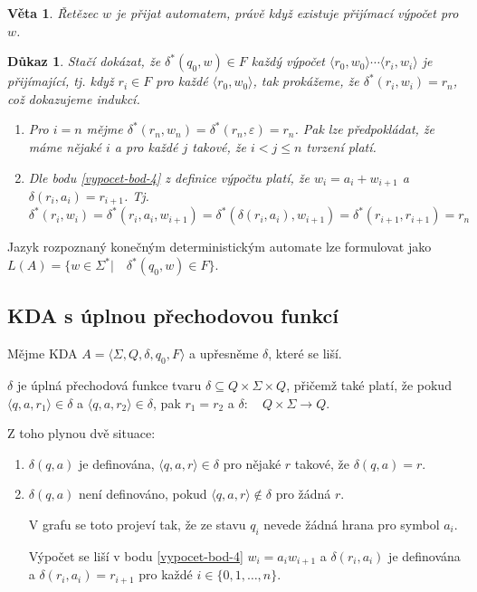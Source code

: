 \documentclass[10pt, a4paper, titlepage]{article}
\theoremstyle{note}
\newtheorem{dukaz}{Důkaz}
\newtheorem{veta}{Věta}
\begin{document}
\begin{veta}
Řetězec $w$ je přijat automatem, právě když existuje přijímací výpočet pro $w$.
\end{veta}

\begin{dukaz}
Stačí dokázat, že $\delta^*(q_0,w) \in F$ každý výpočet $\langle r_0, w_0 \rangle \cdots \langle r_i, w_i \rangle$ je přijímající,
tj. když $r_i \in F$ pro každé $\langle r_0, w_0 \rangle$, tak prokážeme, že $\delta^*(r_i, w_i) = r_n$, což dokazujeme indukcí.
\begin{enumerate}
\item
Pro $i = n$ mějme $\delta^*(r_n,w_n) = \delta^*(r_n, \varepsilon) = r_n$. Pak lze předpokládat, že máme nějaké $i$ a pro každé $j$ takové,
že $i < j \leq n$ tvrzení platí.

\item
Dle bodu \ref{vypocet-bod-4} z definice výpočtu platí, že $w_i = a_i + w_{i+1}$ a $\delta(r_i, a_i) = r_{i+1}$.
Tj.  $\delta^*(r_i,w_i) = \delta^*(r_i,a_i,w_{i+1}) = \delta^*(\delta(r_i, a_i), w_{i+1}) = \delta^*(r_{i+1}, r_{i+1}) = r_n$
\end{enumerate}
\end{dukaz}

Jazyk rozpoznaný konečným deterministickým automate lze formulovat jako
$L(A) = \lbrace w \in \Sigma^* |\quad \delta^*(q_0,w) \in F \rbrace$.

\subsection{KDA s úplnou přechodovou funkcí}

Mějme KDA $A = \langle \Sigma, Q, \delta, q_0, F \rangle$ a upřesněme $\delta$, které se liší.

$\delta$ je úplná přechodová funkce tvaru $\delta \subseteq Q \times \Sigma \times Q$, přičemž také platí, že
pokud $\langle q, a, r_1 \rangle \in \delta$ a $\langle q,a,r_2 \rangle \in \delta$, pak $r_1 = r_2$ a $\delta:\quad Q \times \Sigma \rightarrow Q$.

Z toho plynou dvě situace:
\begin{enumerate}
\item
$\delta(q, a)$ je definována, $\langle q,a,r \rangle \in \delta$ pro nějaké $r$ takové, že $\delta(q,a) = r$.

\item
$\delta(q,a)$ není definováno, pokud $\langle q, a, r \rangle \notin \delta$ pro žádná $r$.

V grafu se toto projeví tak, že ze stavu $q_i$ nevede žádná hrana pro symbol $a_i$.

Výpočet se liší v bodu \ref{vypocet-bod-4} $w_i = a_i w_{i+1}$ a $\delta(r_i, a_i)$ je definována a $\delta(r_i,a_i) = r_{i+1}$
pro každé $i \in \lbrace 0,1,\ldots,n \rbrace$.
\end{enumerate}
\end{document}
